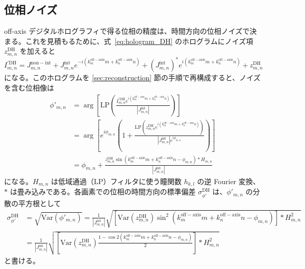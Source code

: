 \subsection{位相ノイズ}

off-axis デジタルホログラフィで得る位相の精度は、時間方向の位相ノイズで決まる。これを見積もるために、式~\eqref{eq:hologram_DH} のホログラムにノイズ項 $z_{m,n}^{\mathrm{DH}}$ を加えると
\begin{equation}
I_{m,n}^{'\mathrm{DH}} = J_{m,n}^{\mathrm{non-int}} + J_{m,n}^{\mathrm{int}} e^{-i(k_m^{\mathrm{off-axis}}m + k_n^{\mathrm{off-axis}}n)} + (J_{m,n}^{\mathrm{int}})^* e^{i(k_m^{\mathrm{off-axis}}m + k_n^{\mathrm{off-axis}}n)} + z_{m,n}^{\mathrm{DH}}
\end{equation}
になる。このホログラムを \ref{sec:reconstruction} 節の手順で再構成すると、ノイズを含む位相像は
\begin{align}
\phi'_{m,n} &= \arg\left[\mathrm{LP}\left(\frac{I_{m,n}^{'\mathrm{DH}} e^{i(k_m^{\mathrm{off-axis}}m + k_n^{\mathrm{off-axis}}n)}}{|J_{m,n}^{\mathrm{int}}|}\right)\right] \nonumber \\
&= \arg\left[e^{i\phi_{m,n}}\left(1 + \frac{\mathrm{LP}(z_{m,n}^{\mathrm{DH}} e^{i(k_m^{\mathrm{off-axis}}m + k_n^{\mathrm{off-axis}}n)})}{|J_{m,n}^{\mathrm{int}}| e^{i\phi_{m,n}}}\right)\right] \nonumber \\
&= \phi_{m,n} + \frac{z_{m,n}^{\mathrm{DH}} \sin(k_m^{\mathrm{off-axis}}m + k_n^{\mathrm{off-axis}}n - \phi_{m,n}) \ast H_{m,n}}{|J_{m,n}^{\mathrm{int}}|}
\end{align}
になる。$H_{m,n}$ は低域通過（LP）フィルタに使う瞳関数 $h_{k,l}$ の逆 Fourier 変換、$\ast$ は畳み込みである。各画素での位相の時間方向の標準偏差 $\sigma_{\phi'}^{\mathrm{DH}}$ は、$\phi'_{m,n}$ の分散の平方根として
\begin{align}
\sigma_{\phi'}^{\mathrm{DH}} &= \sqrt{\mathrm{Var}(\phi'_{m,n})} = \frac{1}{|J_{m,n}^{\mathrm{int}}|} \sqrt{[\mathrm{Var}(z_{m,n}^{\mathrm{DH}}) \sin^2(k_m^{\mathrm{off-axis}}m + k_n^{\mathrm{off-axis}}n - \phi_{m,n})] \ast H_{m,n}^2} \nonumber \\
&= \frac{1}{|J_{m,n}^{\mathrm{int}}|} \sqrt{\left[\mathrm{Var}(z_{m,n}^{\mathrm{DH}}) \frac{1 - \cos 2(k_m^{\mathrm{off-axis}}m + k_n^{\mathrm{off-axis}}n - \phi_{m,n})}{2}\right] \ast H_{m,n}^2} \label{eq:sigma_phi_DH}
\end{align}
と書ける。

